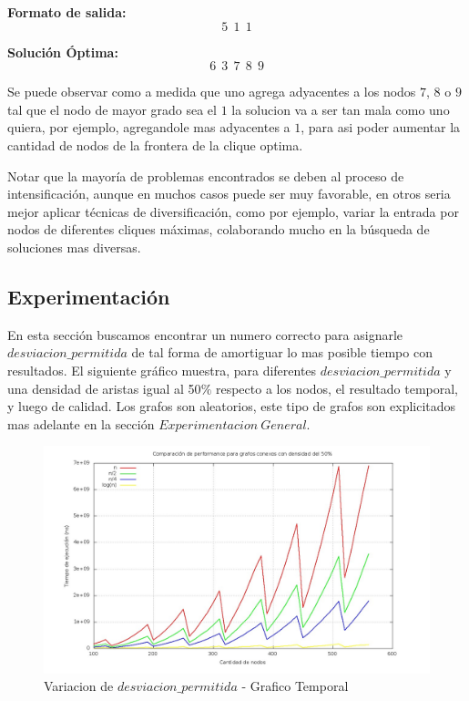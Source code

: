 \textbf{Formato de salida:}
$$5\ \   1\ \   1$$

\textbf{Solución Óptima:}
 $$6\ \   3\ \   7\ \   8\ \   9$$\newline

Se puede observar como a medida que uno agrega adyacentes a los nodos $7$, $8$ o $9$ tal que el nodo de mayor grado sea el $1$ la solucion va a ser tan mala como uno quiera, por ejemplo, agregandole mas adyacentes a $1$, para asi poder aumentar la cantidad de nodos de la frontera de la clique optima. \newline

Notar que la mayoría de problemas encontrados se deben al proceso de intensificación, aunque en muchos casos puede ser muy favorable, en otros seria mejor aplicar técnicas de diversificación, como por ejemplo, variar la entrada por nodos de diferentes cliques máximas, colaborando mucho en la búsqueda de soluciones mas diversas.

\subsection{Experimentación}

 En esta sección buscamos encontrar un numero correcto para asignarle $desviacion\_permitida$ de tal forma de amortiguar lo mas posible tiempo con resultados. \newline
 El siguiente gráfico muestra, para diferentes $desviacion\_permitida$ y una densidad de aristas igual al 50$\%$ respecto a los nodos, el resultado temporal, y luego de calidad. Los grafos son aleatorios, este tipo de grafos son explicitados mas adelante en la sección $Experimentacion\ General$.


\begin{figure}[H] %
\begin{center}
\includegraphics[width=400pt]{../imgs/variaciontemporal_tabu.jpg}
\caption{Variacion de $desviacion\_permitida$ - Grafico Temporal}
\end{center}
\end{figure}

